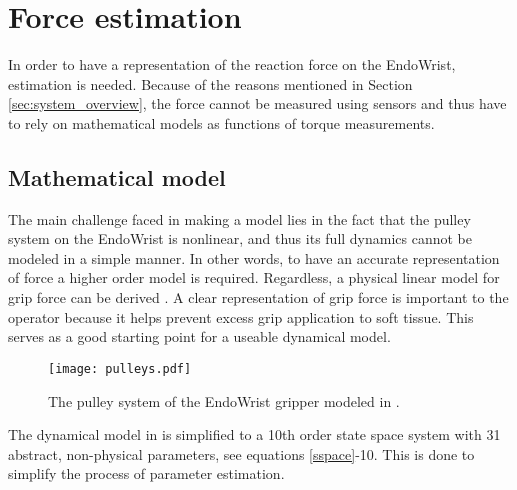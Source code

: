 \section{Force estimation}
In order to have a representation of the reaction force on the EndoWrist, estimation is needed.
Because of the reasons mentioned in Section \ref{sec:system_overview}, the force cannot be measured using sensors and thus have to rely on mathematical models as functions of torque measurements.


\subsection{Mathematical model}
The main challenge faced in making a model lies in the fact that the pulley system on the EndoWrist is nonlinear, and thus its full dynamics cannot be modeled in a simple manner. In other words, to have an accurate representation of force a higher order model is required.
Regardless, a physical linear model for grip force can be derived \cite{kim2014dynamic}.
A clear representation of grip force is important to the operator because it helps prevent excess grip application to soft tissue.
This serves as a good starting point for a useable dynamical model.


\begin{figure}
\centering
\texttt{[image: pulleys.pdf]}
\caption{The pulley system of the EndoWrist gripper modeled in \cite{kim2014dynamic}.}
\label{fig:pully}
\end{figure}






The dynamical model in \cite{kim2014dynamic} is simplified to a 10th order state space system with 31 abstract, non-physical parameters, see equations \ref{sspace}-10.
This is done to simplify the process of parameter estimation.




